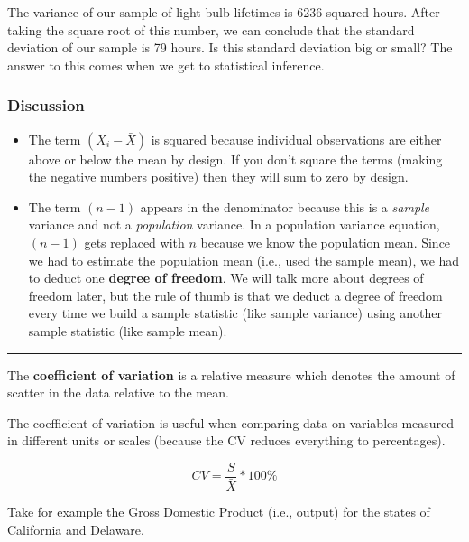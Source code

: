 \documentclass[
]{book}
\newenvironment{Shaded}{\begin{snugshade}}{\end{snugshade}}
\newcommand{\FunctionTok}[1]{\textcolor[rgb]{0.00,0.00,0.00}{#1}}
\newcommand{\NormalTok}[1]{#1}
\newcommand{\OtherTok}[1]{\textcolor[rgb]{0.56,0.35,0.01}{#1}}
\newcommand{\SpecialCharTok}[1]{\textcolor[rgb]{0.00,0.00,0.00}{#1}}
\newcommand{\StringTok}[1]{\textcolor[rgb]{0.31,0.60,0.02}{#1}}
\begin{document}
The variance of our sample of light bulb lifetimes is 6236 squared-hours. After taking the square root of this number, we can conclude that the standard deviation of our sample is 79 hours. Is this standard deviation big or small? The answer to this comes when we get to statistical inference.

\hypertarget{discussion}{%
\subsubsection*{Discussion}\label{discussion}}

\begin{itemize}
\item
  The term \((X_i-\bar{X})\) is squared because individual observations are either above or below the mean by design. If you don't square the terms (making the negative numbers positive) then they will sum to zero by design.
\item
  The term \((n-1)\) appears in the denominator because this is a \emph{sample} variance and not a \emph{population} variance. In a population variance equation, \((n-1)\) gets replaced with \(n\) because we know the population mean. Since we had to estimate the population mean (i.e., used the sample mean), we had to deduct one \textbf{degree of freedom}. We will talk more about degrees of freedom later, but the rule of thumb is that we deduct a degree of freedom every time we build a sample statistic (like sample variance) using another sample statistic (like sample mean).
\end{itemize}

\begin{center}\rule{0.5\linewidth}{0.5pt}\end{center}

The \textbf{coefficient of variation} is a relative measure which denotes the amount of scatter in the data relative to the mean.

The coefficient of variation is useful when comparing data on variables measured in different units or scales (because the CV reduces everything to percentages).

\[CV=\frac{S}{\bar{X}}*100\%\]

Take for example the Gross Domestic Product (i.e., output) for the states of California and Delaware.

\begin{Shaded}
\end{Shaded}
\end{document}
